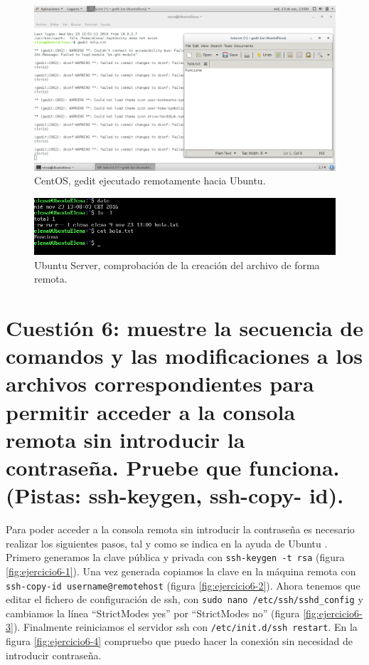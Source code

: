 \begin{figure}[H] 
	\centering
	\includegraphics[width=15cm]{./img/ejercicio5b3.png} 	
	\caption{CentOS, gedit ejecutado remotamente hacia Ubuntu.} \label{fig:ejercicio5b3}
\end{figure}

\begin{figure}[H] 
	\centering
	\includegraphics[width=15cm]{./img/ejercicio5b4.png} 	
	\caption{Ubuntu Server, comprobación de la creación del archivo de forma remota.} \label{fig:ejercicio5b4}
\end{figure}



\section{Cuestión 6: muestre la secuencia de comandos y las modificaciones a los archivos correspondientes para permitir acceder a la consola remota sin introducir la contraseña. Pruebe que funciona. (Pistas: ssh-keygen, ssh-copy- id).}
Para poder acceder a la consola remota sin introducir la contraseña es necesario realizar los siguientes pasos, tal y como se indica en la ayuda de Ubuntu \cite{sshPass}.\\

Primero generamos la clave pública y privada con \texttt{ssh-keygen -t rsa} (figura \ref{fig:ejercicio6-1}).
Una vez generada copiamos la clave en la máquina remota con \texttt{ssh-­copy-­id username@remotehost} (figura \ref{fig:ejercicio6-2}).
Ahora tenemos que editar el fichero de configuración de ssh, con \texttt{sudo nano /etc/ssh/sshd\_config} y cambiamos la línea ``StrictModes yes'' por ``StrictModes no'' (figura \ref{fig:ejercicio6-3}). Finalmente reiniciamos el servidor ssh con \texttt{/etc/init.d/ssh restart}. En la figura \ref{fig:ejercicio6-4} compruebo que puedo hacer la conexión sin necesidad de introducir contraseña.


